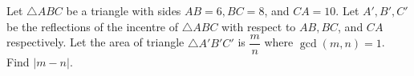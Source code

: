 Let $\bigtriangleup ABC$ be a triangle with sides $AB = 6, BC = 8$, and $CA = 10$. Let $A',B',C'$ be the reflections of the incentre of $\bigtriangleup ABC$ with respect to $AB,BC$, and $CA$ respectively. Let the area of triangle $\bigtriangleup A'B'C'$ is $\dfrac{m}{n}$ where $\gcd(m,n) = 1$. Find $|m-n|$.
